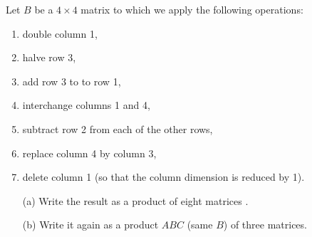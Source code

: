 \documentclass[10pt]{article}
\begin{document}
\maketitle

\begin{problem}[Exercise 1.1]
Let \( B \) be a \( 4\times 4 \) matrix to which we apply the following operations:
\begin{enumerate}[topsep=0pt,itemsep=-1ex,partopsep=1ex,parsep=1ex]
	\item double column 1,
	\item halve row 3,
	\item add row 3 to to row 1,
	\item interchange columns 1 and 4,
	\item subtract row 2 from each of the other rows,
	\item replace column 4 by column 3,
	\item delete column 1 (so that the column dimension is reduced by 1).
\end{enumerate}
\begin{enumerate}
	\item[(a)] Write the result as a product of eight matrices .
	\item[(b)] Write it again as a product \( ABC \) (same \( B \)) of three matrices.
\end{enumerate}
\end{problem}
\end{document}
